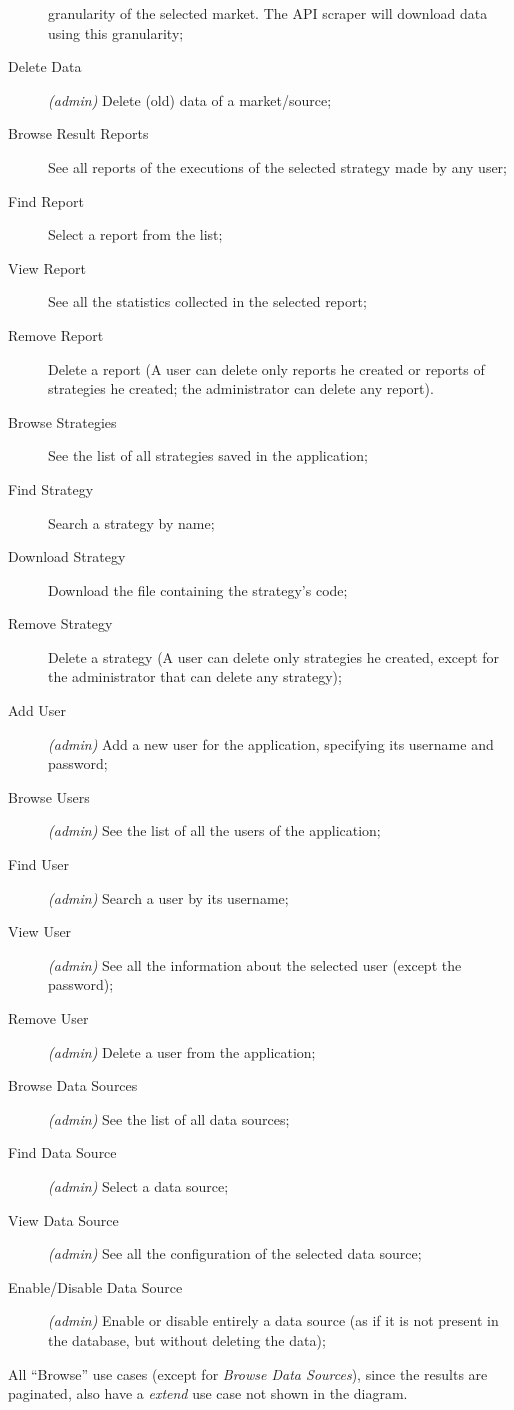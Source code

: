 \begin{description}
		granularity of the selected market. The API scraper will
		download data using this granularity;
	\item[Delete Data] \textit{(admin)} Delete (old) data of a
		market/source;
	\item[Browse Result Reports] See all reports of the executions of the
		selected strategy made by any user;
	\item[Find Report] Select a report from the list;
	\item[View Report] See all the statistics collected in the selected
		report;
	\item[Remove Report] Delete a report (A user can delete only reports he
		created or reports of strategies he created; the administrator
		can delete any report).
	\item[Browse Strategies] See the list of all strategies saved in the
		application;
	\item[Find Strategy] Search a strategy by name;
	\item[Download Strategy] Download the file containing the strategy's
		code;
	\item[Remove Strategy] Delete a strategy (A user can delete only
		strategies he created, except for the administrator that can
		delete any strategy);
	\item[Add User] \textit{(admin)} Add a new user for the application,
		specifying its username and password;
	\item[Browse Users] \textit{(admin)} See the list of all the users of
		the application;
	\item[Find User] \textit{(admin)} Search a user by its username;
	\item[View User] \textit{(admin)} See all the information about the
		selected user (except the password);
	\item[Remove User] \textit{(admin)} Delete a user from the application;
	\item[Browse Data Sources] \textit{(admin)} See the list of all data
		sources;
	\item[Find Data Source] \textit{(admin)} Select a data source;
	\item[View Data Source] \textit{(admin)} See all the configuration of
		the selected data source;
	\item[Enable/Disable Data Source] \textit{(admin)} Enable or disable
		entirely a data source (as if it is not present in the database,
		but without deleting the data);
\end{description}

All \enquote{Browse} use cases (except for \emph{Browse Data Sources}), since
the results are paginated, also have a 
\emph{extend} use case not shown in the diagram.

